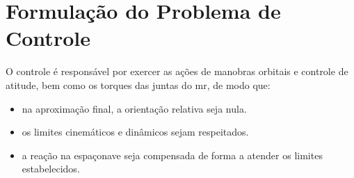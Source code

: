 \section{Formulação do Problema de Controle}
\label{sec:definicao_problema_controle}

O controle é responsável por exercer as ações de manobras orbitais e controle de atitude, bem como os torques das juntas do \gls{mr}, de modo que:

\begin{itemize}
  \item na aproximação final, a orientação relativa seja nula.
  \item os limites cinemáticos e dinâmicos sejam respeitados.
  \item a reação na espaçonave seja compensada de forma a atender os limites estabelecidos.
\end{itemize}

